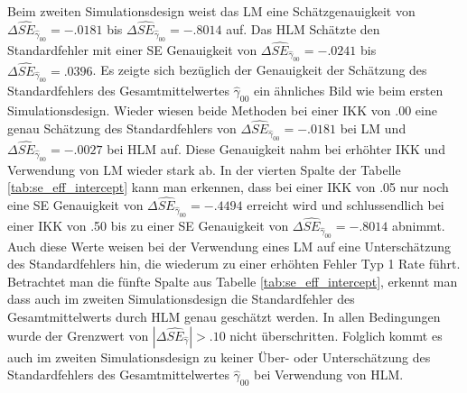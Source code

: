 \documentclass[12pt]{article}\usepackage[]{graphicx}\usepackage[]{color}
\begin{document}
Beim zweiten Simulationsdesign weist das LM eine Schätzgenauigkeit von $\Delta\widehat{SE}_{\widehat{\gamma}_{00}} = -.0181$ bis $\Delta\widehat{SE}_{\widehat{\gamma}_{00}} = -.8014$ auf. Das HLM Schätzte den Standardfehler mit einer SE Genauigkeit von $\Delta\widehat{SE}_{\widehat{\gamma}_{00}} = -.0241$ bis $\Delta\widehat{SE}_{\widehat{\gamma}_{00}} = .0396$. Es zeigte sich bezüglich der Genauigkeit der Schätzung des Standardfehlers des Gesamtmittelwertes $\widehat{\gamma}_{00}$ ein ähnliches Bild wie beim ersten Simulationsdesign. Wieder wiesen beide Methoden bei einer IKK von .00 eine genau Schätzung des Standardfehlers von $\Delta\widehat{SE}_{\widehat{\gamma}_{00}} = -.0181$ bei LM und $\Delta\widehat{SE}_{\widehat{\gamma}_{00}} = -.0027$ bei HLM auf. Diese Genauigkeit nahm bei erhöhter IKK und Verwendung von LM wieder stark ab. In der vierten Spalte der Tabelle \ref{tab:se_eff_intercept} kann man erkennen, dass bei einer IKK von .05 nur noch eine SE Genauigkeit von $\Delta\widehat{SE}_{\widehat{\gamma}_{00}} = -.4494$ erreicht wird und schlussendlich bei einer IKK von .50 bis zu einer SE Genauigkeit von $\Delta\widehat{SE}_{\widehat{\gamma}_{00}} = -.8014$ abnimmt. Auch diese Werte weisen bei der Verwendung eines LM auf eine Unterschätzung des Standardfehlers hin, die wiederum zu einer erhöhten Fehler Typ 1 Rate führt. Betrachtet man die fünfte Spalte aus Tabelle \ref{tab:se_eff_intercept}, erkennt man dass auch im zweiten Simulationsdesign die Standardfehler des Gesamtmittelwerts durch HLM genau geschätzt werden. In allen Bedingungen wurde der Grenzwert von $|\Delta\widehat{SE}_{\widehat{\gamma}}| > .10$ nicht überschritten. Folglich kommt es auch im zweiten Simulationsdesign zu keiner Über- oder Unterschätzung des Standardfehlers des Gesamtmittelwertes $\widehat{\gamma}_{00}$ bei Verwendung von HLM.
\end{document}
